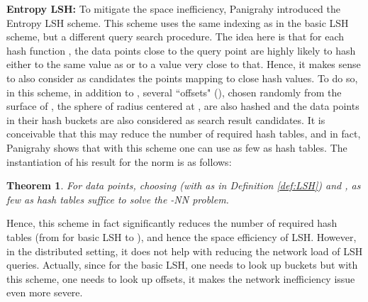 \documentclass{acm_proc_article-sp}
\numberwithin{equation}{section}
\numberwithin{figure}{section}
\newtheorem{thm}{Theorem}
\begin{document}
\noindent \textbf{Entropy LSH: } To mitigate the space inefficiency, Panigrahy \cite{P06} introduced the Entropy LSH scheme. This scheme uses the same indexing as in the basic LSH scheme, but a different query search procedure. The idea here is that for each hash function , the data points close to the query point  are highly likely to hash either to the same value as  or to a value very close to that. Hence, it makes sense to also consider as candidates the points mapping to close hash values. To do so, in this scheme, in addition to , several ``offsets"  (), chosen randomly from the surface of , the sphere of radius  centered at , are also hashed and the data points in their hash buckets are also considered as search result candidates. It is conceivable that this may reduce the number of required hash tables, and in fact, Panigrahy \cite{P06} shows that with this scheme one can use as few as  hash tables. The instantiation of his result for the  norm is as follows:

\begin{thm}
\label{thm:ELSH}
For  data points, choosing  (with  as in Definition \ref{def:LSH}) and , as few as  hash tables suffice to solve the -NN problem.
\end{thm}

Hence, this scheme in fact significantly reduces the number of required hash tables (from  for basic LSH to ), and hence the space efficiency of LSH. However, in the distributed setting, it does not help with reducing the network load of LSH queries. Actually, since for the basic LSH, one needs to look up  buckets but with this scheme, one needs to look up  offsets, it makes the network inefficiency issue even more severe.
\end{document}
